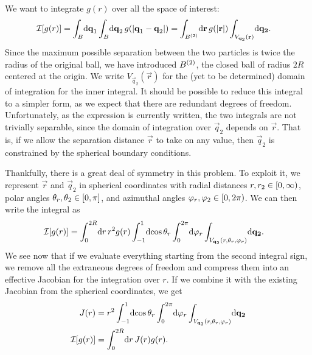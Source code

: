 We want to integrate $g(r)$ over all the space of interest:
\begin{align}
	\mathcal{I}[g(r)]
	&= \int_\ball\! \dif \vec{q}_1 \int_\ball\! \dif \vec{q}_2 \, g(\abs[0]{\vec{q}_1 - \vec{q}_2})
	= \int_{\ball^{(2)}}\! \dif \vec{r} \, g(\abs[0]{\vec{r}}) \int_{V_{\vec{q}_2}(\vec{r})}\! \dif \vec{q_2}.
\end{align}
Since the maximum possible separation between the two particles is twice the radius of the original ball, we have introduced $B^{(2)}$, the closed ball of radius $2 R$ centered at the origin.
We write $V_{\vec{q}_2}(\vec{r})$ for the (yet to be determined) domain of integration for the inner integral.
It should be possible to reduce this integral to a simpler form, as we expect that there are redundant degrees of freedom.
Unfortunately, as the expression is currently written, the two integrals are not trivially separable, since the domain of integration over $\vec{q}_2$ depends on $\vec{r}$.
That is, if we allow the separation distance $\vec{r}$ to take on any value, then $\vec{q}_2$ is constrained by the spherical boundary conditions.

Thankfully, there is a great deal of symmetry in this problem.
To exploit it, we represent $\vec{r}$ and $\vec{q}_2$ in spherical coordinates with radial distances $r, r_2 \in \intco{0, \infty}$, polar angles $\theta_r, \theta_2 \in \intcc{0, \pi}$, and azimuthal angles $\phi_r, \phi_2 \in \intco{0, 2 \pi}$.
We can then write the integral as
\begin{align}
	\mathcal{I}[g(r)]
	&= \int_0^{2 R}\! \dif r \, r^2 g(r) \int_{-1}^1\! \dif \cos{\theta_r} \int_0^{2 \pi}\! \dif \phi_r
		\int_{V_{\vec{q}_2}(r, \theta_r, \phi_r)}\! \dif \vec{q_2}.
\end{align}
We see now that if we evaluate everything starting from the second integral sign, we remove all the extraneous degrees of freedom and compress them into an effective Jacobian for the integration over $r$.
If we combine it with the existing Jacobian from the spherical coordinates, we get
\begin{subequations}
\begin{align}
	J(r)
	&= r^2 \int_{-1}^1\! \dif \cos{\theta_r} \int_0^{2 \pi}\! \dif \phi_r
		\int_{V_{\vec{q}_2}(r, \theta_r, \phi_r)}\! \dif \vec{q_2} \\
	\mathcal{I}[g(r)]
	&= \int_0^{2 R}\! \dif r \, J(r) g(r).
\end{align}
\end{subequations}

